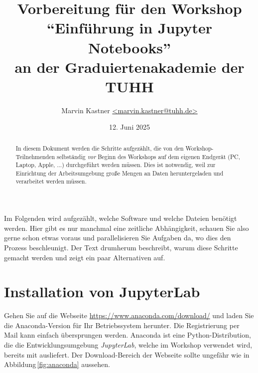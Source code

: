 \documentclass{tufte-handout}
\title{Vorbereitung für den Workshop\\
 \enquote{Einführung in Jupyter Notebooks}\\
 an der Graduiertenakademie der TUHH}
\author{Marvin Kastner \href{mailto:marvin.kastner@tuhh.de}{<marvin.kastner@tuhh.de>}}
\date{12. Juni 2025} %
\begin{document}
\maketitle%

\begin{abstract}
\noindent
In diesem Dokument werden die Schritte aufgezählt, die von den Workshop-Teilnehmenden selbständig \emph{vor} Beginn des Workshops auf dem eigenen Endgerät (PC, Laptop, Apple, ...) durchgeführt werden müssen.
Dies ist notwendig, weil zur Einrichtung der Arbeitsumgebung große Mengen an Daten heruntergeladen und verarbeitet werden müssen.
\end{abstract}

Im Folgenden wird aufgezählt, welche Software und welche Dateien benötigt werden.
Hier gibt es nur manchmal eine zeitliche Abhängigkeit, schauen Sie also gerne schon etwas voraus und parallelisieren Sie Aufgaben da, wo dies den Prozess beschleunigt.
Der Text drumherum beschreibt, warum diese Schritte gemacht werden und zeigt ein paar Alternativen auf.


\section{Installation von JupyterLab}

Gehen Sie auf die Webseite
\url{https://www.anaconda.com/download/} 
und laden Sie die Anaconda-Version für Ihr Betriebssystem herunter.
Die Registrierung per Mail kann einfach übersprungen werden.
Anaconda ist eine Python-Distribution, die die Entwicklungsumgebung \emph{JupyterLab}, welche im Workshop verwendet wird, bereits mit ausliefert.
Der Download-Bereich der Webseite sollte ungefähr wie in Abbildung\,\ref{fig:anaconda} aussehen.
\end{document}
